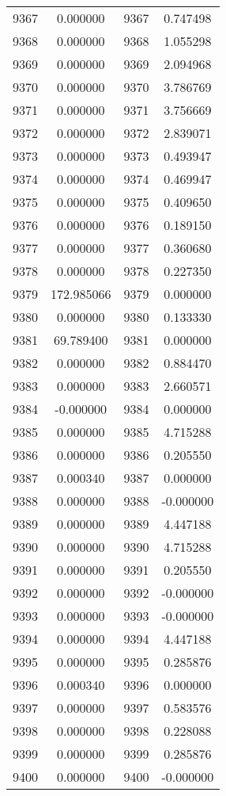 \documentclass[12pt]{article}
\begin{document}
\begin{longtable}{@{}cccc@{}}
9367 & 0.000000 & 9367 & 0.747498 \\
9368 & 0.000000 & 9368 & 1.055298 \\
9369 & 0.000000 & 9369 & 2.094968 \\
9370 & 0.000000 & 9370 & 3.786769 \\
9371 & 0.000000 & 9371 & 3.756669 \\
9372 & 0.000000 & 9372 & 2.839071 \\
9373 & 0.000000 & 9373 & 0.493947 \\
9374 & 0.000000 & 9374 & 0.469947 \\
9375 & 0.000000 & 9375 & 0.409650 \\
9376 & 0.000000 & 9376 & 0.189150 \\
9377 & 0.000000 & 9377 & 0.360680 \\
9378 & 0.000000 & 9378 & 0.227350 \\
9379 & 172.985066 & 9379 & 0.000000 \\
9380 & 0.000000 & 9380 & 0.133330 \\
9381 & 69.789400 & 9381 & 0.000000 \\
9382 & 0.000000 & 9382 & 0.884470 \\
9383 & 0.000000 & 9383 & 2.660571 \\
9384 & -0.000000 & 9384 & 0.000000 \\
9385 & 0.000000 & 9385 & 4.715288 \\
9386 & 0.000000 & 9386 & 0.205550 \\
9387 & 0.000340 & 9387 & 0.000000 \\
9388 & 0.000000 & 9388 & -0.000000 \\
9389 & 0.000000 & 9389 & 4.447188 \\
9390 & 0.000000 & 9390 & 4.715288 \\
9391 & 0.000000 & 9391 & 0.205550 \\
9392 & 0.000000 & 9392 & -0.000000 \\
9393 & 0.000000 & 9393 & -0.000000 \\
9394 & 0.000000 & 9394 & 4.447188 \\
9395 & 0.000000 & 9395 & 0.285876 \\
9396 & 0.000340 & 9396 & 0.000000 \\
9397 & 0.000000 & 9397 & 0.583576 \\
9398 & 0.000000 & 9398 & 0.228088 \\
9399 & 0.000000 & 9399 & 0.285876 \\
9400 & 0.000000 & 9400 & -0.000000 \\

\end{longtable}
\end{document}
